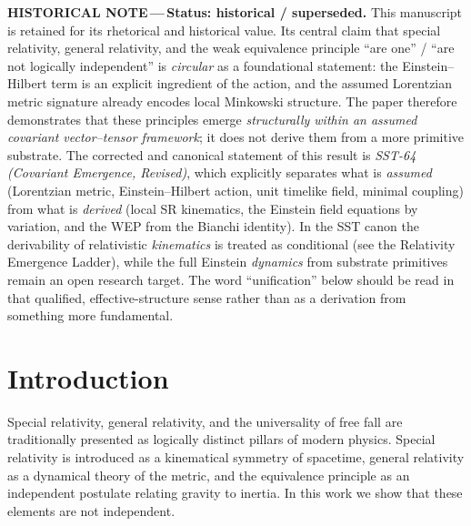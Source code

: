 \documentclass[11pt]{article}
\newcommand{\histnote}[1]{%
  \begin{histbox}
    {\small\color{histtext}\textbf{HISTORICAL NOTE\,---\,}#1}
  \end{histbox}}
\begin{document}
    \histnote{\textbf{Status: historical / superseded.}
    This manuscript is retained for its rhetorical and historical value. Its
    central claim that special relativity, general relativity, and the weak
    equivalence principle ``are one'' / ``are not logically independent'' is
    \emph{circular} as a foundational statement: the Einstein--Hilbert term is an
    explicit ingredient of the action, and the assumed Lorentzian metric
    signature already encodes local Minkowski structure. The paper therefore
    demonstrates that these principles emerge \emph{structurally within an assumed
    covariant vector--tensor framework}; it does not derive them from a more
    primitive substrate. The corrected and canonical statement of this result is
    \emph{SST-64 (Covariant Emergence, Revised)}, which explicitly separates what
    is \emph{assumed} (Lorentzian metric, Einstein--Hilbert action, unit timelike
    field, minimal coupling) from what is \emph{derived} (local SR kinematics, the
    Einstein field equations by variation, and the WEP from the Bianchi identity).
    In the SST canon the derivability of relativistic \emph{kinematics} is treated
    as conditional (see the Relativity Emergence Ladder), while the full Einstein
    \emph{dynamics} from substrate primitives remain an open research target. The
    word ``unification'' below should be read in that qualified, effective-structure
    sense rather than as a derivation from something more fundamental.}



    \section{Introduction}

        Special relativity, general relativity, and the universality of free fall are
        traditionally presented as logically distinct pillars of modern physics.
        Special relativity is introduced as a kinematical symmetry of spacetime,
        general relativity as a dynamical theory of the metric, and the equivalence
        principle as an independent postulate relating gravity to inertia.
        In this work we show that these elements are not independent.
\end{document}

